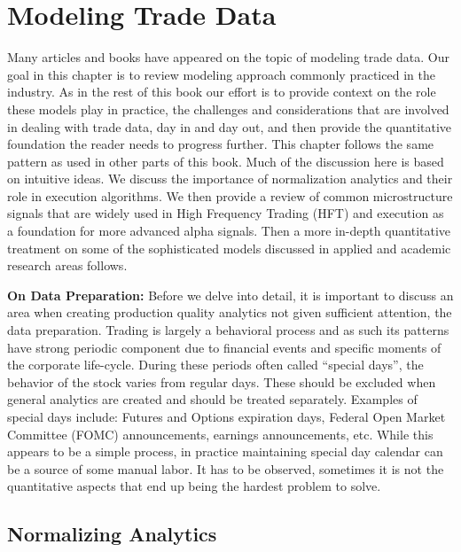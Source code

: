 \chapter{Modeling Trade Data \label{chap:ch_trade_data_models}}

Many articles and books have appeared on the topic of modeling trade data. Our goal in this chapter is to review modeling approach commonly practiced in the industry. As in the rest of this book our effort is to provide context on the role these models play in practice, the challenges and considerations that are involved in dealing with trade data, day in and day out, and then provide the quantitative foundation the reader needs to progress further. This chapter follows the same pattern as used in other parts of this book. Much of the discussion here is based on intuitive ideas. We discuss the importance of normalization analytics and their role in execution algorithms. We then provide a review of common microstructure signals that are widely used in High Frequency Trading (HFT) and execution as a foundation for more advanced alpha signals. Then a more in-depth quantitative treatment on some of the sophisticated models discussed in applied and academic research areas follows. \twomedskip


\noindent\textbf{On Data Preparation:} Before we delve into detail, it is important to discuss an area when creating production quality analytics not given sufficient attention, the data preparation. Trading is largely a behavioral process and as such its patterns have strong periodic component due to financial events and specific moments of the corporate life-cycle. During these periods often called ``special days'', the behavior of the stock varies from regular days. These should be excluded when general analytics are created and should be treated separately. Examples of special days include: Futures and Options expiration days, Federal Open Market Committee (FOMC) announcements, earnings announcements, etc. While this appears to be a simple process, in practice maintaining special day calendar can be a source of some manual labor. It has to be observed, sometimes it is not the quantitative aspects that end up being the hardest problem to solve.



\section{Normalizing Analytics\label{sec:norm_analy_sec}}\label{in:normalization1}\label{in:tda1}\label{in:norm1}

